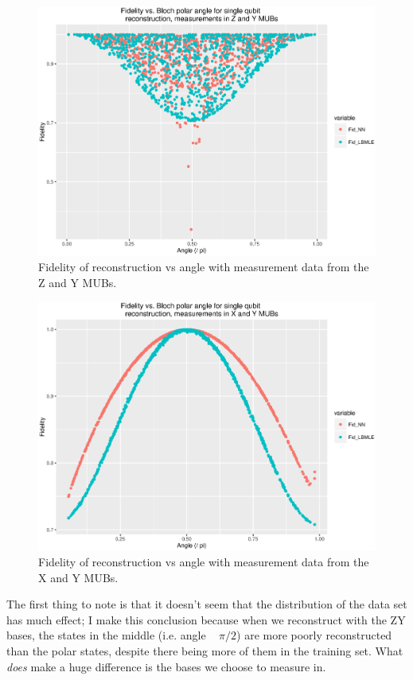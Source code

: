 \documentclass[a4paper,10pt]{article}
\begin{document}
 \begin{figure}
  \includegraphics[scale=0.6]{fid_v_angle_zy}
  \caption{Fidelity of reconstruction vs angle with measurement data from the Z and Y MUBs.}
  \label{fig:fid_v_angle_zy}
 \end{figure}
 
  \begin{figure}
  \includegraphics[scale=0.6]{fid_v_angle_xy}
  \caption{Fidelity of reconstruction vs angle with measurement data from the X and Y MUBs.}
  \label{fig:fid_v_angle_xy}
 \end{figure}
 
 The first thing to note is that it doesn't seem that the distribution of the data set has much effect; I make this conclusion because when we reconstruct with the ZY bases, the states in the middle (i.e. angle ~ $\pi/2$) are more poorly reconstructed than the polar states, despite there being more of them in the training set. What \emph{does} make a huge difference is the bases we choose to measure in.
 
\end{document}
